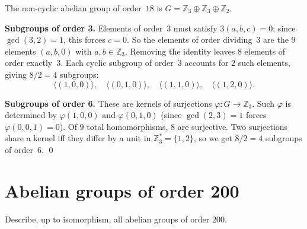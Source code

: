 \documentclass[12pt,a4paper]{article}
\newenvironment{problem}{\begin{mdframed}[style=problemstyle]}{\end{mdframed}}
\newenvironment{sol}{\begin{mdframed}[style=solstyle]}{\end{mdframed}}
\newcommand{\Z}{\mathbb{Z}}
\newcommand{\gen}[1]{\langle #1 \rangle}
\begin{document}
\begin{sol}
The non-cyclic abelian group of order~$18$ is
$G = \Z_3 \oplus \Z_3 \oplus \Z_2$.

\medskip
\textbf{\color{SectCol}Subgroups of order 3.}\;
Elements of order~$3$ must satisfy $3(a,b,c) = 0$; since $\gcd(3,2)=1$, this
forces $c=0$. So the elements of order dividing~$3$ are the $9$ elements
$(a,b,0)$ with $a,b \in \Z_3$. Removing the identity leaves $8$ elements of
order exactly~$3$. Each cyclic subgroup of order~$3$ accounts for $2$ such
elements, giving $8/2 = \boxed{4}$ subgroups:
\[
  \gen{(1,0,0)}, \quad \gen{(0,1,0)}, \quad \gen{(1,1,0)}, \quad \gen{(1,2,0)}.
\]

\textbf{\color{SectCol}Subgroups of order 6.}\;
These are kernels of surjections $\varphi\colon G \to \Z_3$. Such $\varphi$ is
determined by $\varphi(1,0,0)$ and $\varphi(0,1,0)$ (since $\gcd(2,3)=1$ forces
$\varphi(0,0,1)=0$). Of $9$ total homomorphisms, $8$ are surjective.
Two surjections share a kernel iff they differ by a unit in $\Z_3^* = \{1,2\}$,
so we get $8/2 = \boxed{4}$ subgroups of order~$6$. \qed
\end{sol}

\bigskip
\section{Abelian groups of order 200}

\begin{problem}
Describe, up to isomorphism, all abelian groups of order $200$.
\end{problem}
\end{document}
